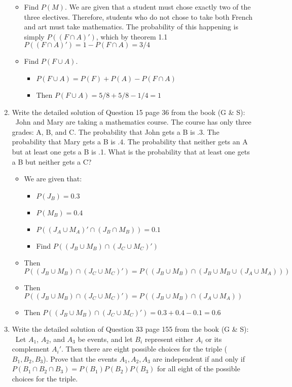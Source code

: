 \documentclass{article}
\begin{document}
\begin{enumerate}
\begin{itemize}
    \item Find $P(M)$. We are given that a student must chose exactly two of the three electives. Therefore, students who do not chose to take both French and art must take mathematics. The probability of this happening is simply $P((F \cap A)')$, which by theorem 1.1 $P((F \cap A)') = 1 - P(F \cap A) = 3/4$
    \item Find $P(F \cup A)$.
        \begin{itemize}
        \item $P(F \cup A) = P(F) + P(A) - P(F \cap A)$
        \item Then $P(F \cup A) = 5/8 + 5/8 - 1/4 = 1$
        \end{itemize}
    \end{itemize}
\item Write the detailed solution of Question 15 page 36 from the book (G \& S): \
    John and Mary are taking a mathematics course. The course has only three grades: A, B, and C. The probability that John gets a B is .3. The probability that Mary gets a B is .4. The probability that neither gets an A but at least one gets a B is .1. What is the probability that at least one gets a B but neither gets a C?
    \begin{itemize}
    \item We are given that:
        \begin{itemize}
        \item $P(J_B) = 0.3$
        \item $P(M_B) = 0.4$
        \item $P((J_A \cup M_A)' \cap (J_B \cap M_B)) = 0.1$
        \item Find $P((J_B \cup M_B) \cap (J_C \cup M_C)')$
        \end{itemize}
    \item Then $P((J_B \cup M_B) \cap (J_C \cup M_C)') = P((J_B \cup M_B) \cap (J_B \cup M_B \cup (J_A \cup M_A)))$
    \item Then $P((J_B \cup M_B) \cap (J_C \cup M_C)') = P((J_B \cup M_B) \cap (J_A \cup M_A))$
    \item Then $P((J_B \cup M_B) \cap (J_C \cup M_C)') = 0.3 + 0.4 - 0.1 = 0.6$
    \end{itemize}
\item Write the detailed solution of Question 33 page 155 from the book (G \& S): \
    Let $A_1$, $A_2$, and $A_3$ be events, and let $B_i$ represent either $A_i$ or its complement $A_i'$. Then there are eight possible choices for the triple ($B_1, B_2, B_3$). Prove that the events $A_1, A_2, A_3$ are independent if and only if $P(B_1 \cap B_2 \cap B_3) = P(B_1)P(B_2)P(B_3)$ for all eight of the possible choices for the triple.

\end{enumerate}
\end{document}

